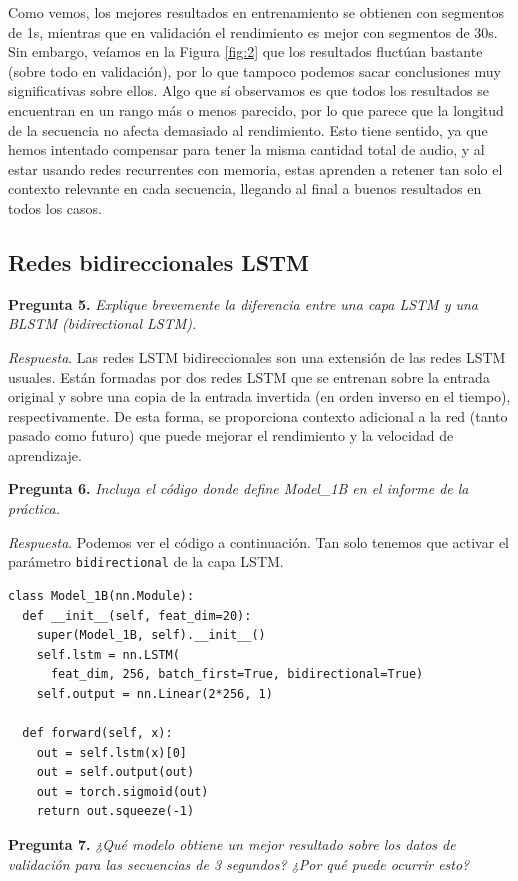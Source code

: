 \documentclass[11pt]{article}
\begin{document}
Como vemos, los mejores resultados en entrenamiento se obtienen con segmentos de 1s, mientras que en validación el rendimiento es mejor con segmentos de 30s. Sin embargo, veíamos en la Figura \ref{fig:2} que los resultados fluctúan bastante (sobre todo en validación), por lo que tampoco podemos sacar conclusiones muy significativas sobre ellos. Algo que sí observamos es que todos los resultados se encuentran en un rango más o menos parecido, por lo que parece que la longitud de la secuencia no afecta demasiado al rendimiento. Esto tiene sentido, ya que hemos intentado compensar para tener la misma cantidad total de audio, y al estar usando redes recurrentes con memoria, estas aprenden a retener tan solo el contexto relevante en cada secuencia, llegando al final a buenos resultados en todos los casos.

\subsection{Redes bidireccionales LSTM}

\textbf{Pregunta 5.} \textit{Explique brevemente la diferencia entre una capa LSTM y una BLSTM (bidirectional LSTM).}

\textit{Respuesta}. Las redes LSTM bidireccionales son una extensión de las redes LSTM usuales. Están formadas por dos redes LSTM que se entrenan sobre la entrada original y sobre una copia de la entrada invertida (en orden inverso en el tiempo), respectivamente. De esta forma, se proporciona contexto adicional a la red (tanto pasado como futuro) que puede mejorar el rendimiento y la velocidad de aprendizaje.

\textbf{Pregunta 6.} \textit{Incluya el código donde define Model\_1B en el informe de la práctica.}

\textit{Respuesta}. Podemos ver el código a continuación. Tan solo tenemos que activar el parámetro \texttt{bidirectional} de la capa LSTM.

\begin{verbatim}
class Model_1B(nn.Module):
  def __init__(self, feat_dim=20):
    super(Model_1B, self).__init__()
    self.lstm = nn.LSTM(
      feat_dim, 256, batch_first=True, bidirectional=True)
    self.output = nn.Linear(2*256, 1)

  def forward(self, x):
    out = self.lstm(x)[0]
    out = self.output(out)
    out = torch.sigmoid(out)
    return out.squeeze(-1)
\end{verbatim}

\textbf{Pregunta 7.} \textit{¿Qué modelo obtiene un mejor resultado sobre los datos de validación para las secuencias de 3 segundos? ¿Por qué puede ocurrir esto?}
\end{document}
